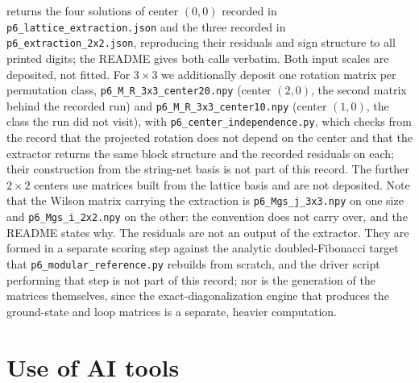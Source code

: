 \documentclass[aps,pra,twocolumn,superscriptaddress,longbibliography,floatfix,nofootinbib]{revtex4-2}
\begin{document}
returns the four solutions of center $(0,0)$ recorded in
\texttt{p6\_lattice\_extraction.json} and the three recorded in
\texttt{p6\_extraction\_2x2.json}, reproducing their residuals and sign structure to
all printed digits; the README gives both calls verbatim. Both input scales are
deposited, not fitted. For $3\times3$ we additionally deposit one rotation
matrix per permutation class, \texttt{p6\_M\_R\_3x3\_center20.npy} (center
$(2,0)$, the second matrix behind the recorded run) and
\texttt{p6\_M\_R\_3x3\_center10.npy} (center $(1,0)$, the class the run did not
visit), with \texttt{p6\_center\_independence.py}, which checks from the record
that the projected rotation does not depend on the center and that the extractor
returns the same block structure and the recorded residuals on each; their
construction from the string-net basis is not part of this record. The further
$2\times2$ centers use matrices built from the lattice basis and are not
deposited. Note that the
Wilson matrix carrying the extraction is \texttt{p6\_Mgs\_j\_3x3.npy} on one size
and \texttt{p6\_Mgs\_i\_2x2.npy} on the other: the convention does not carry over,
and the README states why. The residuals
are not an output of the extractor. They are formed in a separate scoring step
against the analytic doubled-Fibonacci target that
\texttt{p6\_modular\_reference.py} rebuilds from scratch, and the driver script
performing that step is not part of this record; nor is the generation of the
matrices themselves, since the exact-diagonalization engine that produces the
ground-state and loop matrices is a separate, heavier computation.

\section*{Use of AI tools}
\end{document}
